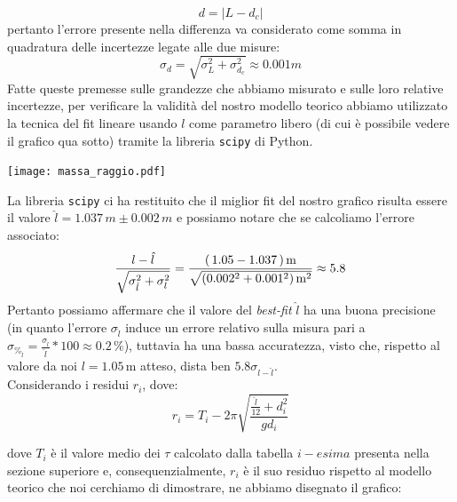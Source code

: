 \documentclass{article}
\begin{document}
$$
	d = | L - d_c |
$$
pertanto l'errore presente nella differenza va considerato come somma in quadratura delle incertezze legate alle due misure:
$$
	\sigma_d = \sqrt{\sigma_L^2 + \sigma_{d_c}^2} \approx 0.001 m
$$
Fatte queste premesse sulle grandezze che abbiamo misurato e sulle loro relative incertezze, per verificare la validità del nostro modello teorico abbiamo utilizzato la tecnica del fit lineare usando $l$ come parametro libero (di cui è possibile vedere il grafico qua sotto) tramite la libreria \texttt{scipy} di Python. \\
\begin{minipage}{0.4\textwidth}
	\texttt{[image: massa\_raggio.pdf]}
\end{minipage}
\hspace{0.2\textwidth}
\begin{minipage}{0.4\textwidth}

La libreria \texttt{scipy} ci ha restituito che il miglior fit del nostro grafico risulta essere il valore $\hat{l} = 1.037 \, m \pm 0.002 \, m$ e possiamo notare che se calcoliamo l'errore associato:
$$
	\frac{l - \hat{l}}{\sqrt{\sigma^2_{\hat{l}} + \sigma^2_{l}}} = \\ \frac{(\, 1.05 - 1.037 \, ) \, \text{m}}{\sqrt{(0.002^2 + 0.001^2) \, \text{m}^2}} \approx \\ 5.8
$$
Pertanto possiamo affermare che il valore del \emph{best-fit} $\hat{l}$ ha una buona precisione (in quanto l'errore $\sigma_{\hat{l}}$ induce un errore relativo sulla misura pari a $\sigma_{\%_{\hat{l}}} = \frac{\sigma_{\hat{l}}}{\hat{l}} * 100 \approx 0.2 \, \% $), tuttavia ha una bassa accuratezza, visto che, rispetto al valore da noi $l=1.05 \, \text{m}$ atteso, dista ben $5.8\sigma_{l-\hat{l}}$. \\
Considerando i residui $r_{i}$, dove:
\begin{equation}
	r_i = T_i - 2\pi\sqrt{\frac{\frac{\hat{l}}{12} + d_i^2}{gd_i}}
\end{equation}
\end{minipage}
dove $T_i$ è il valore medio dei $\tau$ calcolato dalla tabella $i-esima$ presenta nella sezione superiore e, consequenzialmente, $r_i$ è il suo residuo rispetto al modello teorico che noi cerchiamo di dimostrare, ne abbiamo disegnato il grafico:  \\
\end{document}
